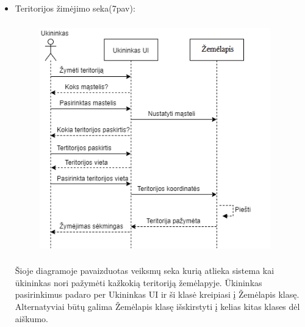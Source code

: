 \documentclass[oneside]{VUMIFPSkursinis}
\begin{document}
\begin{itemize}
\pagebreak

\item Teritorijos žimėjimo seka(7pav):
	\begin{figure}[H]
		\centering	
	\includegraphics[width=10cm,height=10cm,keepaspectratio]{ŽymėtiTeritorijas.png}
	\caption{}
	\label{fig:ŽymėtiTeritorijas}
\end{figure}

Šioje diagramoje pavaizduotas veiksmų seka kurią atlieka sistema kai ūkininkas nori pažymėti kažkokią teritoriją žemėlapyje. Ūkininkas pasirinkimus padaro per Ukininkas UI ir ši klasė kreipiasi į Žemėlapis klasę. Alternatyviai būtų galima Žemėlapis klasę išskirstyti į kelias kitas klases dėl aiškumo.

\end{itemize}
\end{document}
